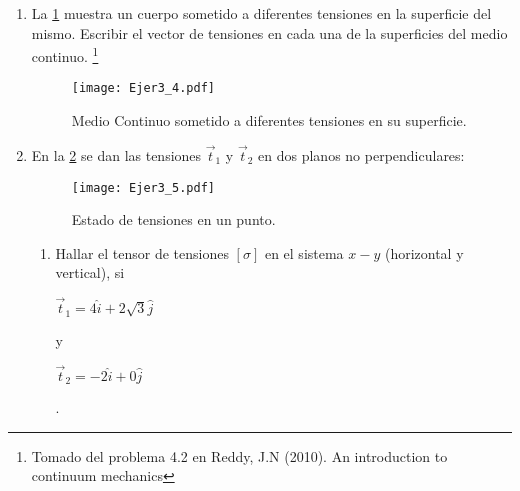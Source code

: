 \documentclass[../notas medios.tex]{subfiles}
\begin{document}
\begin{enumerate}
\item \label{punto04} La  \cref{caras} muestra un cuerpo sometido a
diferentes tensiones en la superficie del mismo. Escribir el vector de tensiones
en cada una de la superficies del medio continuo. \footnote{Tomado del problema 4.2 en Reddy, J.N (2010). An introduction to continuum mechanics}
%
\begin{figure}[H]
	\centering
	\texttt{[image: Ejer3\_4.pdf]}
	\caption{Medio Continuo sometido a diferentes tensiones en su superficie.}
	\label{caras}
\end{figure}	
\item \label{punto05} En la  \cref{cuna:tensiones} se dan las tensiones
$\vec{t}_1$ y $\vec{t}_2$ en dos planos no perpendiculares:\\
%	
\begin{figure}[H]
	\centering
	\texttt{[image: Ejer3\_5.pdf]}
	\caption{Estado de tensiones en un punto.}
	\label{cuna:tensiones}
\end{figure}
\begin{enumerate}
	\item Hallar el tensor de tensiones $[\sigma]$ en el sistema $x-y$ (horizontal y vertical), si \begin{large} $\vec{t}_1= 4 \hat{i} + 2 \sqrt{3} \hat{j}$ \end{large} y  \begin{large} $\vec{t}_2= -2 \hat{i} +0 \hat{j}$ \end{large}.\\
\end{enumerate}


\end{enumerate}
\end{document}
